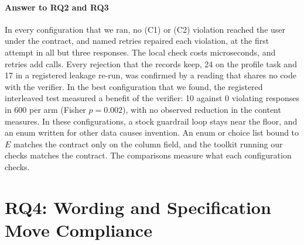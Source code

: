 \documentclass[10pt,twocolumn]{article}
\begin{document}
\paragraph{Answer to RQ2 and RQ3}
In every configuration that we ran, no (C1) or (C2) violation reached the user
under the contract, and named retries repaired each violation, at the first
attempt in all but three responses. The local check costs microseconds, and
retries add calls. Every rejection that the records keep, 24 on the profile
task and 17 in a registered leakage re-run, was confirmed by a reading that
shares no code with the verifier. In the best configuration that we found, the
registered interleaved test measured a benefit of the verifier: 10 against 0
violating responses in 600 per arm (Fisher $p=0.002$), with no observed
reduction in the content measures. In these configurations, a
stock guardrail loop stays near the floor, and an enum written for other data
causes invention. An enum or choice list bound to $E$ matches the contract
only on the column field, and the toolkit running our checks matches the
contract. The comparisons measure what each configuration checks.

\section{RQ4: Wording and Specification Move Compliance}\label{sec:rq4}
\end{document}

